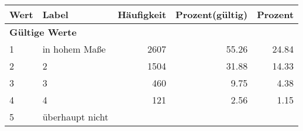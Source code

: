      \begin{longtable}{lXrrr}
     \toprule
     \textbf{Wert} & \textbf{Label} & \textbf{Häufigkeit} & \textbf{Prozent(gültig)} & \textbf{Prozent} \\
     \endhead
     \midrule
     \multicolumn{5}{l}{\textbf{Gültige Werte}}\\

     1 &
     \multicolumn{1}{X}{ in hohem Maße   } &


       \num{2607} &
       \num[round-mode=places,round-precision=2]{55.26} &
         \num[round-mode=places,round-precision=2]{24.84} \\

     2 &
     \multicolumn{1}{X}{ 2   } &


       \num{1504} &
       \num[round-mode=places,round-precision=2]{31.88} &
         \num[round-mode=places,round-precision=2]{14.33} \\

     3 &
     \multicolumn{1}{X}{ 3   } &


       \num{460} &
       \num[round-mode=places,round-precision=2]{9.75} &
         \num[round-mode=places,round-precision=2]{4.38} \\

     4 &
     \multicolumn{1}{X}{ 4   } &


       \num{121} &
       \num[round-mode=places,round-precision=2]{2.56} &
         \num[round-mode=places,round-precision=2]{1.15} \\

     5 &
     \multicolumn{1}{X}{ überhaupt nicht   } &



\end{longtable}

